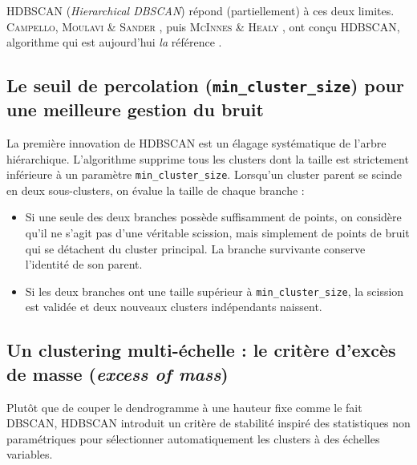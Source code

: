HDBSCAN (\emph{Hierarchical DBSCAN}) répond (partiellement) à ces deux limites. \textsc{Campello, Moulavi} \& \textsc{Sander} \cite{HDBSCAN}, puis \textsc{McInnes} \& \textsc{Healy} \cite{HDBSCAN2017}, ont conçu HDBSCAN, algorithme qui est aujourd'hui \emph{la} référence \cite{HDBSCAN2025SOTA, FLASC2025}.



\subsection{Le seuil de percolation (\texttt{min\_cluster\_size}) pour une meilleure gestion du bruit}

La première innovation de HDBSCAN est un élagage systématique de l'arbre hiérarchique. L'algorithme supprime tous les clusters dont la taille est strictement inférieure à un paramètre \texttt{min\_cluster\_size}. Lorsqu'un cluster parent se scinde en deux sous-clusters, on évalue la taille de chaque branche :
\begin{itemize}
    \item Si une seule des deux branches possède suffisamment de points, on considère qu'il ne s'agit pas d'une véritable scission, mais simplement de points de bruit qui se détachent du cluster principal. La branche survivante conserve l'identité de son parent.
    \item Si les deux branches ont une taille supérieur à \texttt{min\_cluster\_size}, la scission est validée et deux nouveaux clusters indépendants naissent.
\end{itemize}



\subsection{Un clustering multi-échelle : le critère d'excès de masse (\emph{excess of mass})}

Plutôt que de couper le dendrogramme à une hauteur fixe comme le fait DBSCAN, HDBSCAN introduit un critère de stabilité inspiré des statistiques non paramétriques \cite{MullerSawitzki} pour sélectionner automatiquement les clusters à des échelles variables.

